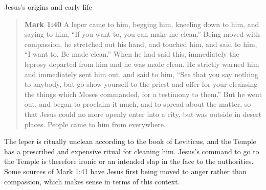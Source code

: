 \documentclass[8pt]{article}
\newcommand{\quotesize}{\large{}}
\newenvironment{quotetext}{\begin{quote}\quotesize}{\end{quote}}
\newcommand{\bible}[2]{\begin{quotetext}\textbf{#1} #2\end{quotetext}}
\newcommand{\gospelmark}[2]{\bible{Mark #1}{#2}}
\begin{document}
\begin{section}{Jesus's origins and early life}
\gospelmark{1:40}{A leper came to him, begging him, kneeling down to him, and saying to him, ``If you want to, you can make me clean.''
  Being moved with compassion, he stretched out his hand, and touched him, and said to him, ``I want to. Be made clean.''   When he had said this, immediately the leprosy departed from him and he was made clean.   He strictly warned him and immediately sent him out,   and said to him, ``See that you say nothing to anybody, but go show yourself to the priest and offer for your cleansing the things which Moses commanded, for a testimony to them.''
  But he went out, and began to proclaim it much, and to spread about the matter, so that Jesus could no more openly enter into a city, but was outside in desert places. People came to him from everywhere. }

The leper is ritually unclean according to the book of Leviticus, and the Temple has a prescribed
and expensive ritual for cleaning him. Jesus's command to go to the Temple is therefore ironic
or an intended slap in the face to the authorities. Some sources of Mark 1:41 have Jesus first being
moved to anger rather than compassion, which makes sense in terms of this context.

\end{section}
\end{document}
